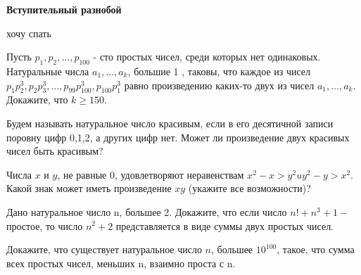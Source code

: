 \centerline{\bf \Huge Вступительный разнобой}

\begin{flushright}
        \scriptsize{хочу спать}
\end{flushright}

 Пусть $p_1, p_2, \ldots, p_{100}$ - сто простых чисел, среди которых нет одинаковых. Натуральные числа $a_1, \ldots, a_k$, большие 1 , таковы, что каждое из чисел $p_1 p_2^3, p_2 p_3^3, \ldots, p_{99} p_{100}^3, p_{100} p_1^3$ равно произведению каких-то двух из чисел $a_1, \ldots, a_k$. Докажите, что $k \geq 150$. 

Будем называть натуральное число красивым, если в его десятичной записи поровну цифр 0,1,2, а других цифр нет. Может ли произведение двух красивых чисел быть красивым?

Числа $x$ и $y$, не равные 0, удовлетворяют неравенствам $x^2-x>y^2 u y^2-y>x^2$. Какой знак может иметь произведение $xy$ (укажите все возможности)?

Дано натуральное число n, большее 2. Докажите, что если число $n!+n^3+1-$ простое, то число $n^2+2$ представляется в виде суммы двух простых чисел.

Докажите, что существует натуральное число $n$, большее $10^{100}$, такое, что сумма всех простых чисел, меньших n, взаимно проста с n.
